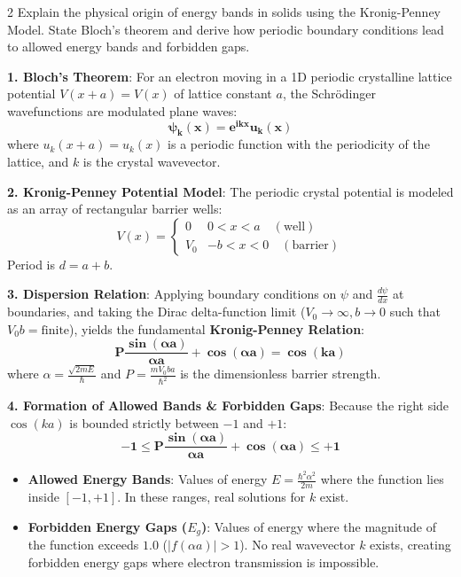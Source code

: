 \begin{theoryq}{2}
Explain the physical origin of energy bands in solids using the Kronig-Penney Model. State Bloch's theorem and derive how periodic boundary conditions lead to allowed energy bands and forbidden gaps.
\end{theoryq}
\begin{theorysol}
\textbf{1. Bloch's Theorem}:
For an electron moving in a 1D periodic crystalline lattice potential $V(x + a) = V(x)$ of lattice constant $a$, the Schrödinger wavefunctions are modulated plane waves:
\begin{equation}
\mathbf{\psi_k(x) = e^{i k x} u_k(x)}
\end{equation}
where $u_k(x + a) = u_k(x)$ is a periodic function with the periodicity of the lattice, and $k$ is the crystal wavevector.

\textbf{2. Kronig-Penney Potential Model}:
The periodic crystal potential is modeled as an array of rectangular barrier wells:
\begin{equation}
V(x) = \begin{cases} 0 & 0 < x < a \quad (\text{well}) \\ V_0 & -b < x < 0 \quad (\text{barrier}) \end{cases}
\end{equation}
Period is $d = a + b$.

\textbf{3. Dispersion Relation}:
Applying boundary conditions on $\psi$ and $\frac{d\psi}{dx}$ at boundaries, and taking the Dirac delta-function limit ($V_0 \to \infty, b \to 0$ such that $V_0 b = \text{finite}$), yields the fundamental \textbf{Kronig-Penney Relation}:
\begin{equation}
\mathbf{P \frac{\sin(\alpha a)}{\alpha a} + \cos(\alpha a) = \cos(k a)}
\end{equation}
where $\alpha = \frac{\sqrt{2mE}}{\hbar}$ and $P = \frac{m V_0 b a}{\hbar^2}$ is the dimensionless barrier strength.

\textbf{4. Formation of Allowed Bands \& Forbidden Gaps}:
Because the right side $\cos(ka)$ is bounded strictly between $-1$ and $+1$:
\begin{equation}
\mathbf{-1 \le P \frac{\sin(\alpha a)}{\alpha a} + \cos(\alpha a) \le +1}
\end{equation}
\begin{itemize}
    \item \textbf{Allowed Energy Bands}: Values of energy $E = \frac{\hbar^2\alpha^2}{2m}$ where the function lies inside $[-1, +1]$. In these ranges, real solutions for $k$ exist.
    \item \textbf{Forbidden Energy Gaps ($E_g$)}: Values of energy where the magnitude of the function exceeds $1.0$ ($|f(\alpha a)| > 1$). No real wavevector $k$ exists, creating forbidden energy gaps where electron transmission is impossible.
\end{itemize}
\end{theorysol}
\vspace{4mm}

